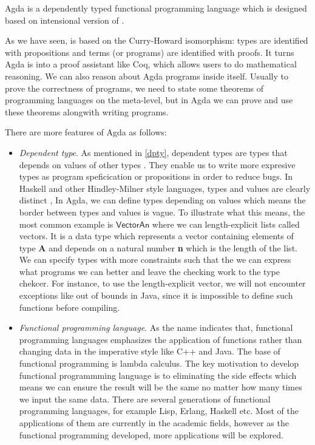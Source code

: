Agda is a dependently typed functional programming language which is designed based on intensional version
of \mltt{} \cite{agdawiki:main}. 

As we have seen, \mltt{} is based on the Curry-Howard
isomorphism: types are identified with propositions and terms (or programs) are identified with proofs. It turns Agda is into a proof assistant like Coq, which allows users to do mathematical reasoning. We can also reason about Agda programs inside itself.
Usually to prove the correctness of programs, we need to state some theorems of programming languages on the meta-level, but in Agda we can prove and use these theorems alongwith writing programs.

There are more features of Agda as follows:

\begin{itemize}
\item \textit{Dependent type}. 
As mentioned in \ref{dpty}, dependent types are types that depends on values of other types \cite{dtw}. They enable us to write more expresive types as program speficication or propositions in order to reduce bugs. In Haskell and other Hindley-Milner style languages, types and values are clearly distinct \cite{tutorial}, In Agda, we can define types depending on values which means the border between types and values is vague. To illustrate what this means, the most common example is $\mathsf{Vector A n}$ where we can length-explicit lists called vectors. It is a data type which represents a vector containing elements of type \textbf{A} and depends on a natural number \textbf{n} which is the length of the list. We can specify types with more constraints such that the we can express what programs we can better and leave the checking work to the type chekcer. For instance, to use the length-explicit vector, we will not encounter exceptions like out of bounds in Java, since it is impossible to define such functions before compiling.

\item \textit{Functional programming language}. As the name indicates that, functional programming languages emphasizes the application of functions rather than changing data in the imperative style like C++ and Java. The base of functional programming is lambda calculus. The key motivation to develop functional programmming language is to eliminating the side effects which means we can ensure the result will be the same no matter how many times we input the same data. There are several generations of functional programming languages, for example Lisp, Erlang, Haskell etc. Most of the applications of them are currently in the academic fields, however as the functional programming developed, more applications will be explored.


\end{itemize}
